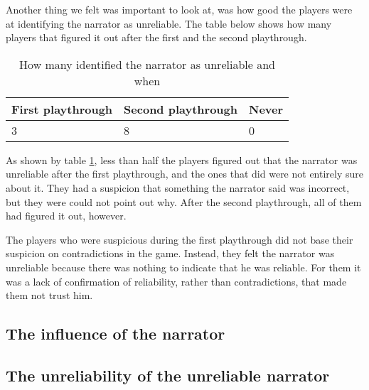 Another thing we felt was important to look at, was how good the players were at identifying the narrator as unreliable. The table below shows how many players that figured it out after the first and the second playthrough.
\begin{table}
\begin{center}
\renewcommand{\arraystretch}{1.3}
\caption {How many identified the narrator as unreliable and when}
\label{table-unreliable_narrator}
\begin{tabular}{ | p{2.3cm} | p{2.3cm} | p{2.3cm} | }
  \hline                       
  \textbf{First playthrough} & \textbf{Second playthrough} & \textbf{Never} \\
  \hline  
  3 & 8 & 0 \\
  \hline  
\end{tabular} 
\end{center}
\end{table}

As shown by table \ref{table-unreliable_narrator}, less than half the players figured out that the narrator was unreliable after the first playthrough, and the ones that did were not entirely sure about it. They had a suspicion that something the narrator said was incorrect, but they were could not point out why. After the second playthrough, all of them had figured it out, however.

The players who were suspicious during the first playthrough did not base their suspicion on contradictions in the game. Instead, they felt the narrator was unreliable because there was nothing to indicate that he was reliable. For them it was a lack of confirmation of reliability, rather than contradictions, that made them not trust him.
\subsection{The influence of the narrator}


\subsection{The unreliability of the unreliable narrator}


